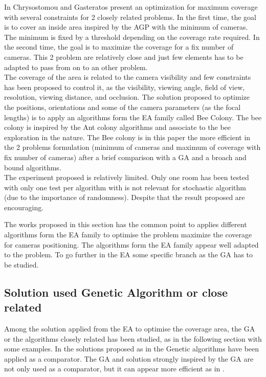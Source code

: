  In Chrysostomou and Gasteratos \cite{82*chrysostomou2012} present an optimization for maximum coverage with several constraints for 2 closely related problems. In the first time, the goal is to cover an inside area inspired by the AGP with the minimum of cameras. The minimum is fixed by a threshold depending on the coverage rate required. In the second time, the goal is to maximize the coverage for a fix number of cameras. This 2 problem are relatively close and just few elements has to be adapted to pass from on to an other problem.\\
The coverage of the area is related to the camera visibility and few constraints has been proposed to control it, as  the visibility, viewing angle, field of view, resolution, viewing distance, and occlusion. The solution proposed to optimize the positions, orientations and some of the camera parameters (as the focal lengths) is to apply an algorithms form the EA family called Bee Colony. The bee colony is inspired by the Ant colony algorithms and associate to the bee exploration in the nature. The Bee colony is in this  paper \cite{82*chrysostomou2012} the more efficient in the 2 problems formulation (minimum of cameras and maximum of coverage with fix number of cameras) after a brief comparison with a GA and a broach and bound algorithms. \\
The experiment proposed is relatively limited. Only one room has been tested with only one test per algorithm with is not relevant for stochastic algorithm (due to the importance of randomness). Despite that the result proposed are encouraging. 

The works proposed in this section has the common point to applies different algorithms form the EA family to optimise the problem maximize the coverage for cameras positioning. The algorithms form the EA family appear well adapted to the problem. To go further in the EA some specific branch as the GA has to be studied.

\subsection{Solution used Genetic Algorithm or close related}

 Among the solution applied from the EA to optimise the coverage area, the GA or the algorithms closely related has been studied, as in the following section with some examples.
 In the solutions proposed as in \cite{82*chrysostomou2012,33*reddy2012,141*akbarzadeh2013} the Genetic algorithms have been applied as a comparator. The GA and solution strongly inspired by the GA  are not only used as a comparator, but it can appear more efficient as in \cite{83*van2009,101*topcuoglu2009,165*jiang2010,152*wang2009}.


